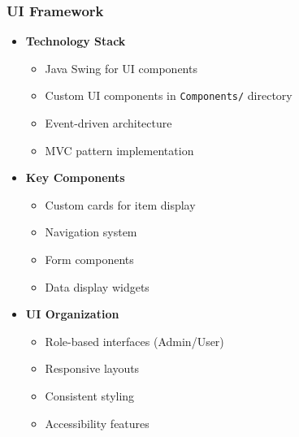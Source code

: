 \documentclass[12pt,a4paper]{article}
\begin{document}
\subsubsection{UI Framework}
\begin{itemize}
    \item \textbf{Technology Stack}
    \begin{itemize}
        \item Java Swing for UI components
        \item Custom UI components in \texttt{Components/} directory
        \item Event-driven architecture
        \item MVC pattern implementation
    \end{itemize}
    
    \item \textbf{Key Components}
    \begin{itemize}
        \item Custom cards for item display
        \item Navigation system
        \item Form components
        \item Data display widgets
    \end{itemize}
    
    \item \textbf{UI Organization}
    \begin{itemize}
        \item Role-based interfaces (Admin/User)
        \item Responsive layouts
        \item Consistent styling
        \item Accessibility features
    \end{itemize}
\end{itemize}
\end{document}
